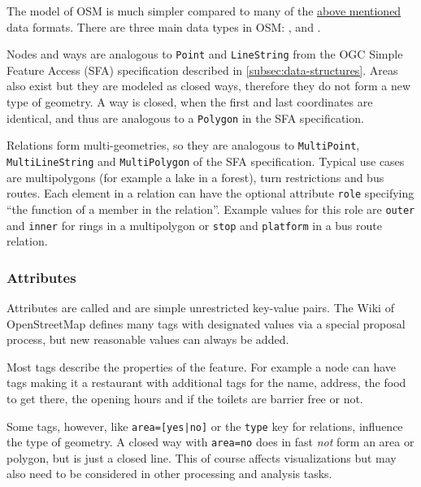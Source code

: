 			The model of OSM is much simpler compared to many of the \hyperref[subsec:file-formats]{above mentioned} data formats.
			There are three main data types in OSM: ,  and \cite{osm-wiki-data-model}.
			
			Nodes and ways are analogous to \texttt{Point} and \texttt{LineString} from the OGC Simple Feature Access (SFA) specification described in \cref{subsec:data-structures}.
			Areas also exist but they are modeled as closed ways, therefore they do not form a new type of geometry.
			A way is closed, when the first and last coordinates are identical, and thus are analogous to a \texttt{Polygon} in the SFA specification.
			
			Relations form multi-geometries, so they are analogous to \texttt{MultiPoint}, \texttt{MultiLineString} and \texttt{MultiPolygon} of the SFA specification.
			Typical use cases are multipolygons (for example a lake in a forest), turn restrictions and bus routes.
			Each element in a relation can have the optional attribute \texttt{role} specifying \enquote{the function of a member in the relation}\cite{osm-wiki-relation}.
			Example values for this role are \texttt{outer} and \texttt{inner} for rings in a multipolygon or \texttt{stop} and \texttt{platform} in a bus route relation.
			
		\subsubsection{Attributes}
		\label{subsubsec:osm-attributes}
			
			Attributes are called  and are simple unrestricted key-value pairs.
			The Wiki of OpenStreetMap defines many tags with designated values via a special proposal process, but new reasonable values can always be added\cite{osm-wiki-proposal-process}.
			
			Most tags describe the properties of the feature.
			For example a node can have tags making it a restaurant with additional tags for the name, address, the food to get there, the opening hours and if the toilets are barrier free or not.
			
			Some tags, however, like \texttt{area=[yes|no]} or the \texttt{type} key for relations, influence the type of geometry.
			A closed way with \texttt{area=no} does in fast \textit{not} form an area or polygon, but is just a closed line.
			This of course affects visualizations but may also need to be considered in other processing and analysis tasks.
			
